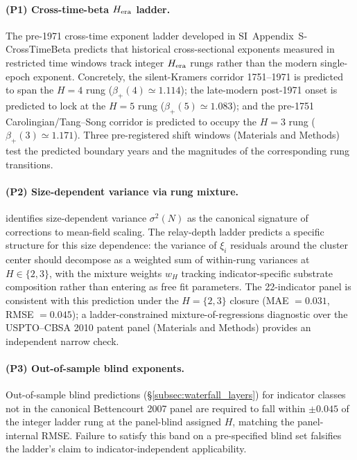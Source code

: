 \paragraph{(P1) Cross-time-beta $H_{\rm era}$ ladder.}
The pre-1971 cross-time exponent ladder developed in
SI~Appendix~S-CrossTimeBeta predicts that historical cross-sectional
exponents measured in restricted time windows track integer
$H_{\rm era}$ rungs rather than the modern single-epoch exponent.
Concretely, the silent-Kramers corridor 1751--1971 is predicted to span
the $H{=}4$ rung ($\beta_+(4)\simeq 1.114$); the late-modern post-1971
onset is predicted to lock at the $H{=}5$ rung
($\beta_+(5)\simeq 1.083$); and the pre-1751
Carolingian/Tang--Song corridor is predicted to occupy the $H{=}3$ rung
($\beta_+(3)\simeq 1.171$). Three pre-registered shift windows
(Materials and Methods) test the predicted boundary years and the
magnitudes of the corresponding rung transitions.

\paragraph{(P2) Size-dependent variance via rung mixture.}
\citet{Bettencourt2020SciAdv} identifies size-dependent
variance $\sigma^2(N)$ as the canonical signature of corrections to
mean-field scaling. The relay-depth ladder predicts a specific structure
for this size dependence: the variance of $\xi_i$ residuals around the
cluster center should decompose as a weighted sum of within-rung
variances at $H\in\{2,3\}$, with the mixture weights $w_H$ tracking
indicator-specific substrate composition rather than entering as free
fit parameters. The 22-indicator panel is consistent with this
prediction under the $H{=}\{2,3\}$ closure (MAE $=0.031$,
RMSE $=0.045$); a ladder-constrained mixture-of-regressions diagnostic
over the USPTO--CBSA 2010 patent panel (Materials and Methods)
provides an independent narrow check.

\paragraph{(P3) Out-of-sample blind exponents.}
Out-of-sample blind predictions (\S\ref{subsec:waterfall_layers})
for indicator classes not in the canonical Bettencourt 2007 panel are
required to fall within $\pm 0.045$ of the integer ladder rung at the
panel-blind assigned $H$, matching the panel-internal RMSE.
Failure to satisfy this band on a pre-specified blind set falsifies the
ladder's claim to indicator-independent applicability.

